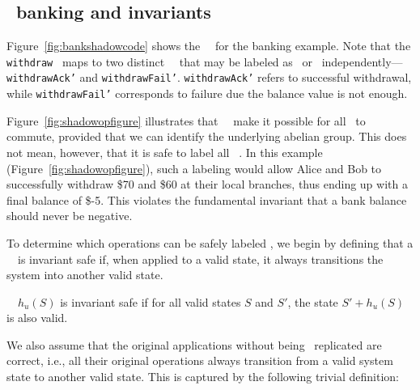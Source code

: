 \subsection{\Shadow\ banking and invariants}
\label{sect:shadowbank}



Figure~\ref{fig:bankshadowcode} shows the \shadow\ \operations\ for
the banking example. Note that the {\tt with\-draw} \operation\ maps
to two distinct \shadow\ \operations\ that may be labeled as \blue\ or \red\ indep\-endently---{\tt with\-drawAck'} and
{\tt with\-drawFail'}. {\tt withdrawAck'} refers to successful withdrawal,
while {\tt withdrawFail'} corresponds to failure due the balance value is not enough.

Figure~\ref{fig:shadowopfigure}
illustrates that \shadow\ \operations\ make it possible
for all \operations\ to commute, provided that we can identify the
underlying abelian group. This does not mean, however,
  that it is safe to label all \operations\ \blue.
In this example (Figure~\ref{fig:shadowopfigure}), such a labeling would allow Alice and Bob to successfully
  withdraw \$70 and \$60 at their local branches, thus ending up with
a final balance of \$-5. This violates the
  fundamental invariant that a bank balance should never be negative.

To determine which operations can be safely labeled
\blue, we begin by defining that a \shadow\ \operation\ is invariant safe if,
  when applied to a valid state, it always transitions the system into
  another valid state.

\begin{mydef} \Shadow\ \operation\ $h_u(S)$ is invariant
  safe if for all valid states $S$ and $ S'$, the state $S'+h_u(S)$ is
  also valid.
\label{def:isafeop}
\end{mydef}

We also assume that the original applications without being \RBct\ replicated
are correct, i.e., all their original operations always transition
from a valid system state to another valid state. This is captured by the following
trivial definition:

